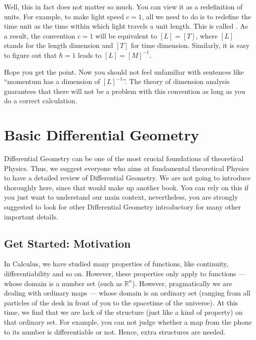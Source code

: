 \documentclass[letterpaper,10pt,english]{sphinxmanual}
\begin{document}
Well, this in fact does not matter so much. You can view it as a redefinition of units. For example, to make light speed \(c=1\), all we need to do is to redefine the time unit as the time within which light travels a unit length. This is called . As a result, the convention \(c=1\) will be equivalent to \([L]=[T]\), where \([L]\) stands for the length dimension and \([T]\) for time dimension. Similarly, it is easy to figure out that \(\hbar=1\) leads to \([L]=[M]^{-1}\).

Hope you get the point. Now you should not feel unfamiliar with sentences like “momentum has a dimension of \([L]^{-1}\)”. The theory of dimension analysis guarantees that there will not be a problem with this convention as long as you do a correct calculation.


\section{Basic Differential Geometry}
\label{\detokenize{bg_diff_geo::doc}}\label{\detokenize{bg_diff_geo:basic-differential-geometry}}
Differential Geometry can be one of the most crucial foundations of theoretical Physics. Thus, we suggest everyone who aims at fundamental theoretical Physics to have a detailed review of Differential Geometry. We are not going to introduce thoroughly here, since that would make up another book. You can rely on this if you just want to understand our main context, nevertheless, you are strongly suggested to look for other Differential Geometry introductory for many other important details.


\subsection{Get Started: Motivation}
\label{\detokenize{bg_diff_geo:get-started-motivation}}
In Calculus, we have studied many properties of functions, like continuity, differentiability and so on. However, these properties only apply to functions — whose domain is a number set (such as \(\mathbb R^n\)). However, pragmatically we are dealing with ordinary maps — whose domain is an ordinary set (ranging from all particles of the desk in front of you to the spacetime of the universe). At this time, we find that we are lack of the structure (just like a kind of property) on that ordinary set. For example, you can not judge whether a map from the phone to its number is differentiable or not. Hence, extra structures are needed.
\end{document}
